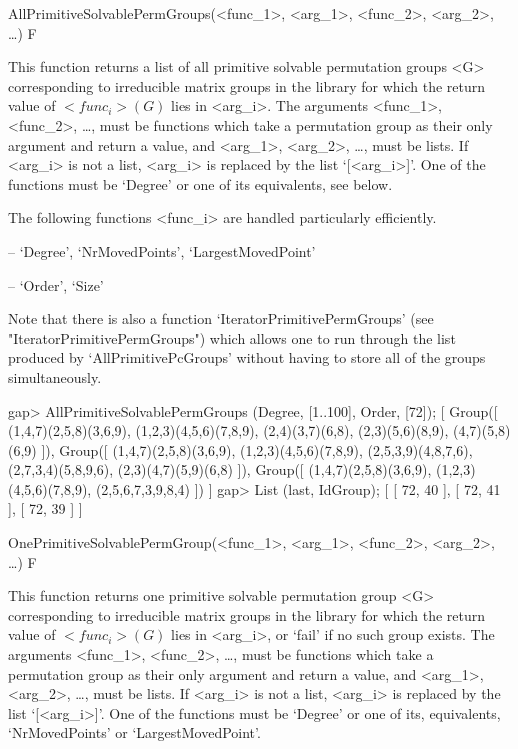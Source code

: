 

\>AllPrimitiveSolvablePermGroups(<func_1>, <arg_1>, <func_2>, <arg_2>, \dots) F

This function returns a list of all primitive solvable permutation
groups <G> corresponding to irreducible matrix groups in the  {\IRREDSOL} library 
for which the return value of $<func_i>(G)$ lies
in <arg_i>.  The arguments <func_1>, <func_2>, \dots,
must be {\GAP} functions which take a permutation group as their only argument and return a
value, and <arg_1>, <arg_2>,
\dots,  must be lists. If <arg_i> is not a list, <arg_i> is replaced by the list
`[<arg_i>]'. One of the functions must be `Degree' or one of its
equivalents, see below.

The following functions <func_i> are handled particularly efficiently. 

\beginlist

\item{--} `Degree', `NrMovedPoints', `LargestMovedPoint'
\item{--} `Order', `Size'
\endlist

Note that there is also a function `IteratorPrimitivePermGroups' (see
"IteratorPrimitivePermGroups") which allows one to run through the list produced by
`AllPrimitivePcGroups' without having to store all of the groups
simultaneously.

\beginexample
gap> AllPrimitiveSolvablePermGroups (Degree, [1..100], Order, [72]);
[ Group([ (1,4,7)(2,5,8)(3,6,9), (1,2,3)(4,5,6)(7,8,9), (2,4)(3,7)(6,8), 
      (2,3)(5,6)(8,9), (4,7)(5,8)(6,9) ]), 
  Group([ (1,4,7)(2,5,8)(3,6,9), (1,2,3)(4,5,6)(7,8,9), (2,5,3,9)(4,8,7,6), 
      (2,7,3,4)(5,8,9,6), (2,3)(4,7)(5,9)(6,8) ]), 
  Group([ (1,4,7)(2,5,8)(3,6,9), (1,2,3)(4,5,6)(7,8,9), (2,5,6,7,3,9,8,4) ]) ]
gap> List (last, IdGroup);
[ [ 72, 40 ], [ 72, 41 ], [ 72, 39 ] ]
\endexample


\>OnePrimitiveSolvablePermGroup(<func_1>, <arg_1>, <func_2>, <arg_2>, \dots) F

This function returns one primitive solvable permutation
group <G> corresponding to irreducible matrix groups in the  {\IRREDSOL} library 
for which the return value of $<func_i>(G)$ lies in
<arg_i>, or `fail' if no such group exists.  The arguments <func_1>, <func_2>, \dots,
must be {\GAP} functions which take a permutation group as their only argument and return a
value, and <arg_1>, <arg_2>,
\dots,  must be lists. If <arg_i> is not a list, <arg_i> is replaced by the list
`[<arg_i>]'. One of the functions must be `Degree' or one of its, equivalents, `NrMovedPoints' or `LargestMovedPoint'.

